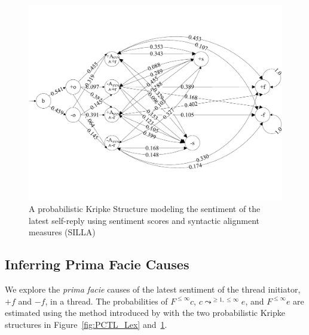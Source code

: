 \documentclass[man,biblatex,floatsintext]{apa6}
\newcommand{\up}{\vspace*{-12pt}}
\begin{document}
\begin{figure}[!htb]
 \centering
  \includegraphics[width=0.99\linewidth]{Figures/model_syn.pdf}
  \caption{A probabilistic Kripke Structure modeling the sentiment of the latest self-reply using sentiment scores and syntactic alignment measures (SILLA)}\label{fig:PCTL_Syn}
  \up
\end{figure}


\subsection{Inferring Prima Facie Causes}

We explore the \emph{prima facie} causes of the latest sentiment of the thread initiator, $+f$ and $-f$, in a thread. The probabilities of $F^{\leq \infty }c$, $c\leadsto^{\geq 1,\leq \infty}e$, and $F^{\leq \infty }e$ are estimated using the method introduced by \textcite{kleinberg_uai09} with the two probabilistic Kripke structures in Figure~\ref{fig:PCTL_Lex} and~\ref{fig:PCTL_Syn}.
\end{document}
